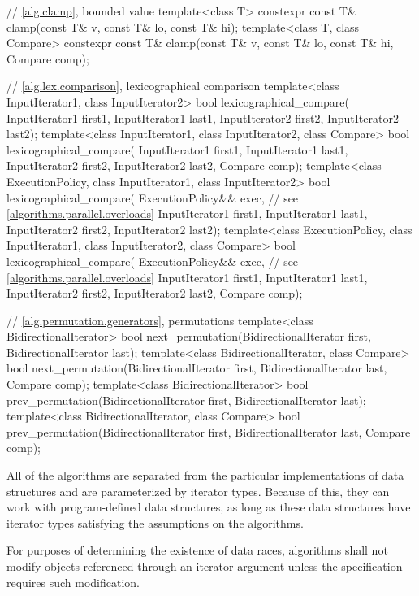 \begin{codeblock}
{  // \ref{alg.clamp}, bounded value
  template<class T>
    constexpr const T& clamp(const T& v, const T& lo, const T& hi);
  template<class T, class Compare>
    constexpr const T& clamp(const T& v, const T& lo, const T& hi, Compare comp);

  // \ref{alg.lex.comparison}, lexicographical comparison
  template<class InputIterator1, class InputIterator2>
    bool lexicographical_compare(
      InputIterator1 first1, InputIterator1 last1,
      InputIterator2 first2, InputIterator2 last2);
  template<class InputIterator1, class InputIterator2, class Compare>
    bool lexicographical_compare(
      InputIterator1 first1, InputIterator1 last1,
      InputIterator2 first2, InputIterator2 last2,
      Compare comp);
  template<class ExecutionPolicy, class InputIterator1, class InputIterator2>
    bool lexicographical_compare(
      ExecutionPolicy&& exec, // see \ref{algorithms.parallel.overloads}
      InputIterator1 first1, InputIterator1 last1,
      InputIterator2 first2, InputIterator2 last2);
  template<class ExecutionPolicy, class InputIterator1, class InputIterator2, class Compare>
    bool lexicographical_compare(
      ExecutionPolicy&& exec, // see \ref{algorithms.parallel.overloads}
      InputIterator1 first1, InputIterator1 last1,
      InputIterator2 first2, InputIterator2 last2,
      Compare comp);

  // \ref{alg.permutation.generators}, permutations
  template<class BidirectionalIterator>
    bool next_permutation(BidirectionalIterator first,
                          BidirectionalIterator last);
  template<class BidirectionalIterator, class Compare>
    bool next_permutation(BidirectionalIterator first,
                          BidirectionalIterator last, Compare comp);
  template<class BidirectionalIterator>
    bool prev_permutation(BidirectionalIterator first,
                          BidirectionalIterator last);
  template<class BidirectionalIterator, class Compare>
    bool prev_permutation(BidirectionalIterator first,
                          BidirectionalIterator last, Compare comp);
}
\end{codeblock}

\pnum
All of the algorithms are separated from the particular implementations of data structures and are
parameterized by iterator types.
Because of this, they can work with program-defined data structures, as long
as these data structures have iterator types satisfying the assumptions on the algorithms.

\pnum
For purposes of determining the existence of data races, algorithms shall
not modify objects referenced through an iterator argument unless the
specification requires such modification.

